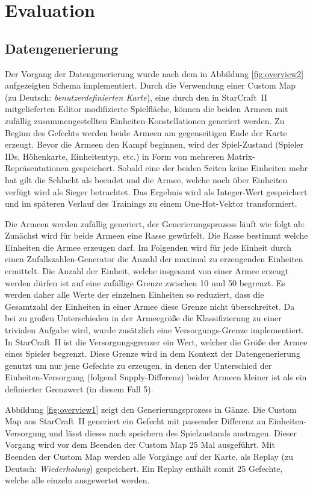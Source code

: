 \section{Evaluation}

\subsection{Datengenerierung}
\label{datagen}

Der Vorgang der Datengenerierung wurde nach dem in Abbildung \ref{fig:overview2} aufgezeigten Schema implementiert. Durch die Verwendung einer Custom Map (zu Deutsch: \textit{benutzerdefinierten Karte}), eine durch den in StarCraft~II mitgelieferten Editor modifizierte Spielfläche, können die beiden Armeen mit zufällig zusammengestellten Einheiten-Konstellationen generiert werden. Zu Beginn des Gefechts werden beide Armeen am gegenseitigen Ende der Karte erzeugt. Bevor die Armeen den Kampf beginnen, wird der Spiel-Zustand (Spieler IDs, Höhenkarte, Einheitentyp, etc.) in Form von mehreren Matrix-Repräsentationen gespeichert. Sobald eine der beiden Seiten keine Einheiten mehr hat gilt die Schlacht als beendet und die Armee, welche noch über Einheiten verfügt wird als Sieger betrachtet. Das Ergebnis wird als Integer-Wert gespeichert und im späteren Verlauf des Trainings zu einem One-Hot-Vektor transformiert. 

Die Armeen werden zufällig generiert, der Generierungsprozess läuft wie folgt ab: Zunächst wird für beide Armeen eine Rasse gewürfelt. Die Rasse bestimmt welche Einheiten die Armee erzeugen darf. Im Folgenden wird für jede Einheit durch einen Zufallszahlen-Generator die Anzahl der maximal zu erzeugenden Einheiten ermittelt. Die Anzahl der Einheit, welche insgesamt von einer Armee erzeugt werden dürfen ist auf eine zufällige Grenze zwischen 10 und 50 begrenzt. Es werden daher alle Werte der einzelnen Einheiten so reduziert, dass die Gesamtzahl der Einheiten in einer Armee diese Grenze nicht überschreitet. Da bei zu großen Unterschieden in der Armeegröße die Klassifizierung zu einer trivialen Aufgabe wird, wurde zusätzlich eine Versorgungs-Grenze implementiert. In StarCraft~II ist die Versorgungsgrenzer ein Wert, welcher die Größe der Armee eines Spieler begrenzt. Diese Grenze wird in dem Kontext der Datengenerierung genutzt um nur jene Gefechte zu erzeugen, in denen der Unterschied der Einheiten-Versorgung (folgend Supply-Differenz) beider Armeen kleiner ist als ein definierter Grenzwert (in diesem Fall 5).

Abbildung \ref{fig:overview1} zeigt den Generierungsprozess in Gänze. Die Custom Map aus StarCraft~II generiert ein Gefecht mit passender Differenz an Einheiten-Versorgung und lässt dieses nach speichern des Spielzustands austragen. Dieser Vorgang wird vor dem Beenden der Custom Map 25 Mal ausgeführt. Mit Beenden der Custom Map werden alle Vorgänge auf der Karte, als Replay (zu Deutsch: \textit{Wiederholung}) gespeichert. Ein Replay enthält somit 25 Gefechte, welche alle einzeln ausgewertet werden. 


